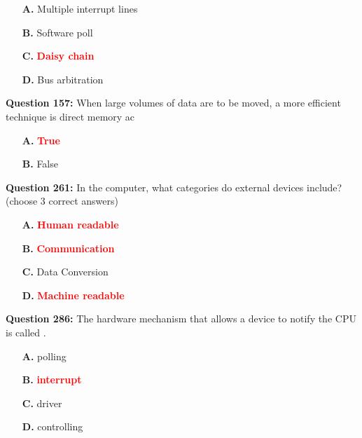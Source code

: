 \documentclass[12pt,a4paper]{article}
\begin{document}
\begin{itemize}
    \item[\textbf{A.}] Multiple interrupt lines
    \item[\textbf{B.}] Software poll
    \item[\textbf{C.}] \textcolor{red}{\textbf{Daisy chain}}
    \item[\textbf{D.}] Bus arbitration
\end{itemize}

\vspace{0.5cm}

\vspace{0.5cm}

\textbf{Question 157:} When large volumes of data are to be moved, a more efficient technique is direct memory ac

\begin{itemize}
    \item[\textbf{A.}] \textcolor{red}{\textbf{True}}
    \item[\textbf{B.}] False
\end{itemize}

\vspace{0.5cm}

\vspace{0.5cm}

\textbf{Question 261:} In the computer, what categories do external devices include? (choose 3 correct answers)

\begin{itemize}
    \item[\textbf{A.}] \textcolor{red}{\textbf{Human readable}}
    \item[\textbf{B.}] \textcolor{red}{\textbf{Communication}}
    \item[\textbf{C.}] Data Conversion
    \item[\textbf{D.}] \textcolor{red}{\textbf{Machine readable}}
\end{itemize}

\vspace{0.5cm}

\vspace{0.5cm}

\textbf{Question 286:} The hardware mechanism that allows a device to notify the CPU is called \underline{\hspace{1.5cm}} .

\begin{itemize}
    \item[\textbf{A.}] polling
    \item[\textbf{B.}] \textcolor{red}{\textbf{interrupt}}
    \item[\textbf{C.}] driver
    \item[\textbf{D.}] controlling
\end{itemize}
\end{document}
